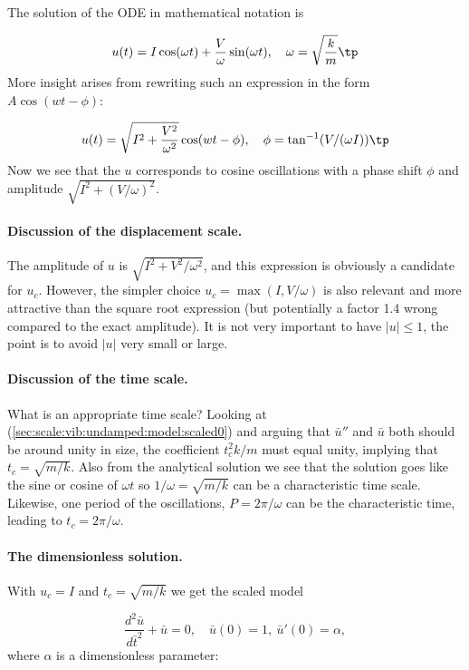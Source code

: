 \documentclass[graybox,envcountchap,sectrefs,final]{svmonodo}
\begin{document}
The solution of the ODE in mathematical notation is

\[ u(t) = I\cos(\omega t) + \frac{V}{\omega}\sin(\omega t),\quad \omega = \sqrt{\frac{k}{m}}\tp\]
More insight arises from rewriting such an expression in the form
$A\cos(wt - \phi)$:

\[ u(t) = \sqrt{I^2 + \frac{V^2}{\omega^2}}\cos(wt - \phi),\quad
\phi = \tan^{-1}(V/(\omega I))\tp
\]
Now we see that the $u$ corresponds to cosine oscillations with a
phase shift $\phi$ and amplitude $\sqrt{I^2 + (V/\omega)^2}$.

\paragraph{Discussion of the displacement scale.}
The amplitude of $u$ is $\sqrt{I^2 + V^2/\omega^2}$, and this
expression is obviously a candidate for $u_c$.  However, the simpler
choice $u_c=\max (I, V/\omega)$ is also relevant and more attractive
than the square root expression (but potentially a factor 1.4 wrong
compared to the exact amplitude).  It is not very important to have
$|u|\leq 1$, the point is to avoid $|u|$ very small or large.

\paragraph{Discussion of the time scale.}
What is an appropriate time scale? Looking at
(\ref{sec:scale:vib:undamped:model:scaled0}) and arguing that
$\bar u''$ and $\bar u$ both should be around unity in size, the
coefficient $t_c^2k/m$ must equal unity, implying that $t_c=\sqrt{m/k}$.
Also from the analytical solution we see that the solution goes like the
sine or cosine of $\omega t$ so $1/\omega = \sqrt{m/k}$ can be a characteristic
time scale. Likewise, one period of the oscillations, $P=2\pi/\omega$ can
be the characteristic time, leading to $t_c=2\pi/\omega$.

\paragraph{The dimensionless solution.}
With $u_c=I$ and $t_c=\sqrt{m/k}$ we get the scaled model

\begin{equation}
\frac{d^2\bar u}{d\bar t^2} + \bar u = 0,
\quad \bar u(0)=1,\ \bar u'(0)=\alpha,
\label{sec:scale:vib:undamped:model:scaled1}
\end{equation}
where $\alpha$ is a dimensionless parameter:
\end{document}
